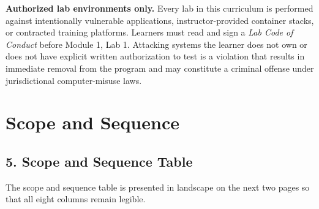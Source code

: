 \documentclass[11pt,letterpaper,oneside]{report}
\begin{document}
\begin{ethics}
\textbf{Authorized lab environments only.} Every lab in this curriculum is performed against intentionally vulnerable applications, instructor-provided container stacks, or contracted training platforms. Learners must read and sign a \emph{Lab Code of Conduct} before Module 1, Lab 1. Attacking systems the learner does not own or does not have explicit written authorization to test is a violation that results in immediate removal from the program and may constitute a criminal offense under jurisdictional computer-misuse laws.
\end{ethics}

\chapter*{Scope and Sequence}

\section*{5. Scope and Sequence Table}
The scope and sequence table is presented in landscape on the next two pages so that all eight columns remain legible.
\end{document}
